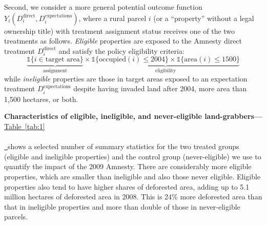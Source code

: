 \documentclass[12pt]{article}
\newcommand*{\tabref}[2][]{%
  \hyperref[{tab:#2}]{%
    Table~\ref*{tab:#2}%
    \ifx\\#1\\%
    \else
      \,#1%
    \fi
  }%
}
\begin{document}
\quad Second, we consider a more general potential outcome function $Y_i(D_i^{\text{direct}}, D_i^{\text{expectations}})$, where a rural parcel $i$ (or a ``property'' without a legal ownership title) with treatment assignment status receives one of the two treatments as follows. \textit{Eligible} properties are exposed to the Amnesty direct treatment $D_i^\text{direct}$ and satisfy the policy eligibility criteria:
\begin{equation}
\underbrace{\mathbb{1}\{i \in \text{target area} \}}_{\text{assignment}}\times\underbrace{\mathbb{1}\{\text{occupied}(i)\leq 2004 \}\times\mathbb{1}\{\text{area}(i)\leq 1500 \}}_{\text{eligibility}} \label{eq:8}
\end{equation}
while \textit{ineligible} properties are those in target areas exposed to an expectation treatment $D_i^\text{expectations}$ despite having invaded land after 2004, more area than 1,500 hectares, or both.
\ 

\textbf{Characteristics of eligible, ineligible, and never-eligible land-grabbers---} \tabref{1} shows a selected number of summary statistics for the two treated groups (eligible and ineligible properties) and the control group (never-eligible) we use to quantify the impact of the 2009 Amnesty. There are considerably more eligible properties, which are smaller than ineligible and also those never eligible. Eligible properties also tend to have higher shares of deforested area, adding up to 5.1 million hectares of deforested area in 2008. This is 24\% more deforested area than that in ineligible properties and more than double of those in never-eligible parcels.
\ 
\end{document}
